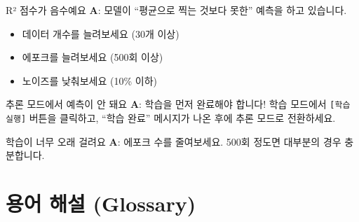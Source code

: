 \documentclass[11pt,a4paper]{article}
\begin{document}
\begin{faqbox}{R² 점수가 음수예요}
\textbf{A}: 모델이 ``평균으로 찍는 것보다 못한'' 예측을 하고 있습니다.
\begin{itemize}
    \item 데이터 개수를 늘려보세요 (30개 이상)
    \item 에포크를 늘려보세요 (500회 이상)
    \item 노이즈를 낮춰보세요 (10\% 이하)
\end{itemize}
\end{faqbox}

\begin{faqbox}{추론 모드에서 예측이 안 돼요}
\textbf{A}: 학습을 먼저 완료해야 합니다!
학습 모드에서 \texttt{[학습 실행]} 버튼을 클릭하고, 
``학습 완료'' 메시지가 나온 후에 추론 모드로 전환하세요.
\end{faqbox}

\begin{faqbox}{학습이 너무 오래 걸려요}
\textbf{A}: 에포크 수를 줄여보세요. 
500회 정도면 대부분의 경우 충분합니다.
\end{faqbox}

\section{용어 해설 (Glossary)}
\end{document}

